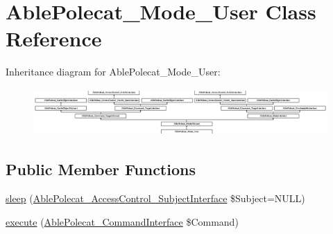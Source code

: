 \hypertarget{class_able_polecat___mode___user}{}\section{Able\+Polecat\+\_\+\+Mode\+\_\+\+User Class Reference}
\label{class_able_polecat___mode___user}
Inheritance diagram for Able\+Polecat\+\_\+\+Mode\+\_\+\+User\+:\begin{figure}[H]
\begin{center}
\leavevmode
\includegraphics[height=1.806452cm]{class_able_polecat___mode___user}
\end{center}
\end{figure}
\subsection*{Public Member Functions}
\begin{DoxyCompactItemize}
\item 
\hyperlink{class_able_polecat___mode___user_a365e24d7b066205cafa2a5cce3a4f224}{sleep} (\hyperlink{interface_able_polecat___access_control___subject_interface}{Able\+Polecat\+\_\+\+Access\+Control\+\_\+\+Subject\+Interface} \$Subject=N\+U\+L\+L)
\item 
\hyperlink{class_able_polecat___mode___user_aa7f01cbd17bffdbbb7511a3c37756064}{execute} (\hyperlink{interface_able_polecat___command_interface}{Able\+Polecat\+\_\+\+Command\+Interface} \$Command)
\end{DoxyCompactItemize}
